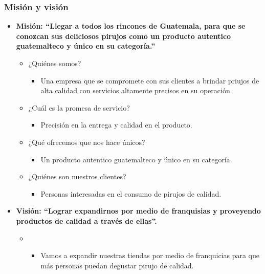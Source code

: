 \documentclass{article}
\begin{document}
\subsubsection{Misión y visión}
\begin{itemize}
    \item \textbf{Misión: ``Llegar a todos los rincones de Guatemala, para que se conozcan sus deliciosos pirujos como un producto autentico guatemalteco y único en su categoría.''}
        \begin{itemize}
            \item ¿Quiénes somos?
                \begin{itemize}
                    \item Una empresa que se compromete con sus clientes a brindar priujos de alta calidad con servicios altamente precisos en su operación.
                \end{itemize}
                
            \item ¿Cuál es la promesa de servicio?
                \begin{itemize}
                    \item Precisión en la entrega y calidad en el producto. 
                \end{itemize}
                
            \item ¿Qué ofrecemos que nos hace únicos?
                \begin{itemize}
                    \item Un producto autentico guatemalteco y único en su categoría.
                \end{itemize}
                
            \item ¿Quiénes son nuestros clientes?
                \begin{itemize}
                    \item Personas interesadas en el consumo de pirujos de calidad.
                \end{itemize}
        \end{itemize}
    
    \item \textbf{ Visión: ``Lograr expandirnos por medio de franquisias y proveyendo productos de calidad a través de ellas''.}
        \begin{itemize}
            \item {} 
                \begin{itemize}
                    \item Vamos a expandir nuestras tiendas por medio de franquicias para que más personas puedan degustar pirujo de calidad.
                \end{itemize}
                

\end{itemize}
\end{itemize}
\end{document}
